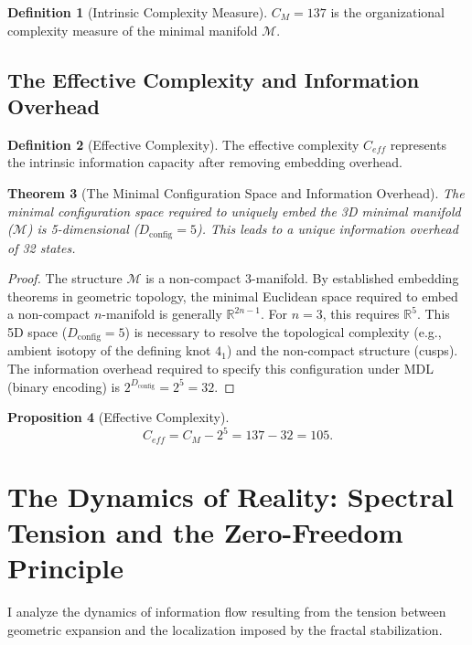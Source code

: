 \documentclass[11pt, a4paper]{article}
\newtheorem{theorem}{Theorem}[section]
\newtheorem{proposition}[theorem]{Proposition}
\theoremstyle{definition}
\newtheorem{definition}[theorem]{Definition}
\theoremstyle{definition}
\newcommand{\R}{\mathbb{R}}
\newcommand{\M}{\mathcal{M}}
\newcommand{\Dconfig}{D_{\mathrm{config}}}
\begin{document}
\begin{definition}[Intrinsic Complexity Measure]
$C_M=137$ is the organizational complexity measure of the minimal manifold $\M$.
\end{definition}

\subsection{The Effective Complexity and Information Overhead}

\begin{definition}[Effective Complexity]
The effective complexity $C_{eff}$ represents the intrinsic information capacity after removing embedding overhead.
\end{definition}

\begin{theorem}[The Minimal Configuration Space and Information Overhead]\label{thm:ConfigSpace}
The minimal configuration space required to uniquely embed the 3D minimal manifold ($\M$) is 5-dimensional ($\Dconfig=5$). This leads to a unique information overhead of 32 states.
\end{theorem}
\begin{proof}
The structure $\M$ is a non-compact 3-manifold. By established embedding theorems in geometric topology, the minimal Euclidean space required to embed a non-compact $n$-manifold is generally $\R^{2n-1}$. For $n=3$, this requires $\R^5$. This 5D space ($\Dconfig=5$) is necessary to resolve the topological complexity (e.g., ambient isotopy of the defining knot $4_1$) and the non-compact structure (cusps). The information overhead required to specify this configuration under MDL (binary encoding) is $2^{\Dconfig} = 2^5 = 32$.
\end{proof}

\begin{proposition}[Effective Complexity]
\begin{equation}
C_{eff} = C_M - 2^5 = 137 - 32 = 105.
\end{equation}
\end{proposition}

\section{The Dynamics of Reality: Spectral Tension and the Zero-Freedom Principle}

I analyze the dynamics of information flow resulting from the tension between geometric expansion and the localization imposed by the fractal stabilization.
\end{document}

